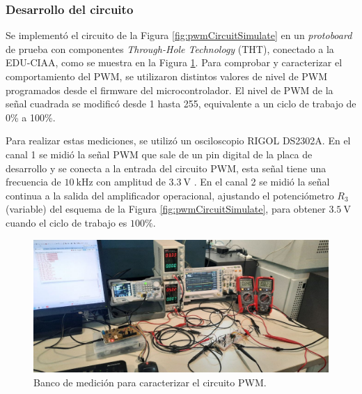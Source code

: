 \subsubsection{Desarrollo del circuito}

Se implementó el circuito de la Figura \ref{fig:pwmCircuitSimulate} en un \textit{protoboard} de prueba con componentes \textit{Through-Hole Technology} (THT), conectado a la EDU-CIAA, como se muestra en la Figura \ref{fig:BancoMedicion1}. Para comprobar y caracterizar el comportamiento del PWM, se utilizaron distintos valores de nivel de PWM programados desde el firmware del microcontrolador. El nivel de PWM de la señal cuadrada se modificó desde 1 hasta 255, equivalente a un ciclo de trabajo de  0\% a 100\%.

Para realizar estas mediciones, se utilizó un osciloscopio RIGOL DS2302A. En el canal 1 se midió la señal PWM que sale de un pin digital de la placa de desarrollo y se conecta a la entrada del circuito PWM, esta señal tiene una frecuencia de $\SI{10}{\kilo\hertz}$ con amplitud de $\SI{3.3}{\volt}$ . En el canal 2 se midió la señal continua a la salida del amplificador operacional, ajustando el potenciómetro $R_{3}$ (variable) del esquema de la Figura \ref{fig:pwmCircuitSimulate}, para obtener $\SI{3.5}{\volt}$ cuando el ciclo de trabajo es $100\%$.


\begin{figure}[H]
    \centering
    \includegraphics[width=1\linewidth]{Figuras/datalogger/Hardware/BancoMedicion1.jpg}
    \caption{Banco de medición para caracterizar el circuito PWM.}
    \label{fig:BancoMedicion1}
\end{figure}

